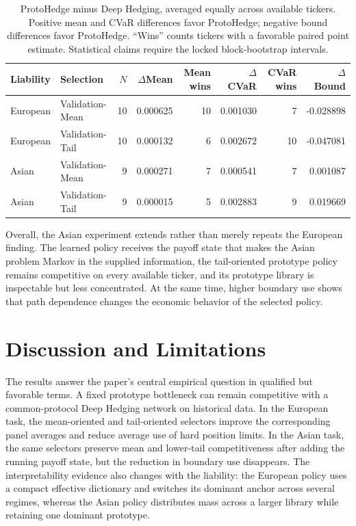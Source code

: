 \documentclass[sigconf]{acmart}
\begin{document}
\begin{table}[t]
\centering
\small
\begin{tabular}{llrrrrrr}
\toprule
Liability & Selection & $N$ & $\Delta$Mean & Mean wins & $\Delta$CVaR & CVaR wins & $\Delta$Bound \\
\midrule
European & Validation-Mean & 10 & 0.000625 & 10 & 0.001030 & 7 & -0.028898 \\
European & Validation-Tail & 10 & 0.000132 & 6 & 0.002672 & 10 & -0.047081 \\
Asian & Validation-Mean & 9 & 0.000271 & 7 & 0.000541 & 7 & 0.001087 \\
Asian & Validation-Tail & 9 & 0.000015 & 5 & 0.002883 & 9 & 0.019669 \\
\bottomrule
\end{tabular}
\caption{ProtoHedge minus Deep Hedging, averaged equally across available
tickers. Positive mean and CVaR differences favor ProtoHedge; negative bound
differences favor ProtoHedge. ``Wins'' counts tickers with a favorable paired
point estimate. Statistical claims require the locked block-bootstrap
intervals.}
\label{tab:cross-liability-summary}
\end{table}

Overall, the Asian experiment extends rather than merely repeats the European
finding. The learned policy receives the payoff state that makes the Asian
problem Markov in the supplied information, the tail-oriented prototype policy
remains competitive on every available ticker, and its prototype library is
inspectable but less concentrated. At the same time, higher boundary use shows
that path dependence changes the economic behavior of the selected policy.
\section{Discussion and Limitations}
\label{sec:discussion}

The results answer the paper's central empirical question in qualified but
favorable terms. A fixed prototype bottleneck can remain competitive with a
common-protocol Deep Hedging network on historical data. In the European task,
the mean-oriented and tail-oriented selectors improve the corresponding panel
averages and reduce average use of hard position limits. In the Asian task,
the same selectors preserve mean and lower-tail competitiveness after adding
the running payoff state, but the reduction in boundary use disappears. The
interpretability evidence also changes with the liability: the European policy
uses a compact effective dictionary and switches its dominant anchor across
several regimes, whereas the Asian policy distributes mass across a larger
library while retaining one dominant prototype.
\end{document}
